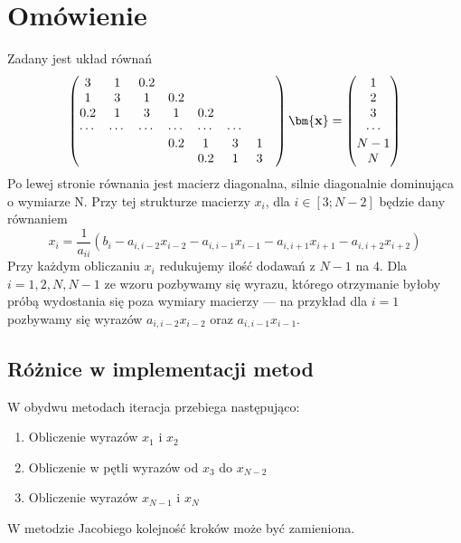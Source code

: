 \documentclass[a4paper,11pt]{article}
\begin{document}
\section{Omówienie}
Zadany jest układ równań
\[
    \left(
        \begin{matrix}
            3 & 1 & 0.2 & & & & & \\
            1 & 3 & 1 & 0.2 & & & & \\
            0.2 & 1 & 3 & 1 & 0.2 & & & \\
            \cdots & \cdots & \cdots & \cdots & \cdots & \cdots & \\
            & & & 0.2 & 1 & 3 & 1 \\
            & & & & 0.2 & 1 & 3
        \end{matrix}
    \right)  
    \bm{\text{\bf{x}}} = 
    \left(
        \begin{matrix}
            1 \\ 2 \\ 3 \\ \cdots \\ N-1 \\ N
        \end{matrix}
    \right)
\]
Po lewej stronie równania jest macierz diagonalna, silnie diagonalnie dominująca o wymiarze N.
Przy tej strukturze macierzy \(x_{i}\), dla \(i \in [3;N-2]\) będzie dany równaniem
\[
    x_{i} = \frac{1}{a_{ii}}(b_{i} - a_{i,i-2}x_{i-2} - a_{i,i-1}x_{i-1} 
    - a_{i,i+1}x_{i+1}-a_{i,i+2}x_{i+2})
\]
Przy każdym obliczaniu \(x_{i}\) redukujemy ilość dodawań z \(N-1\) na \(4\).
Dla \(i = 1, 2, N, N-1\) ze wzoru pozbywamy się wyrazu, 
którego otrzymanie byłoby próbą wydostania się poza wymiary macierzy 
--- na przykład dla \(i = 1\) pozbywamy się wyrazów \(a_{i, i-2}x_{i-2}\) oraz 
\(a_{i, i-1}x_{i-1}\).

\subsection{Różnice w implementacji metod}
W obydwu metodach iteracja przebiega następująco:
\begin{enumerate}
    \item Obliczenie wyrazów \(x_{1}\) i \(x_{2}\)
    \item Obliczenie w pętli wyrazów od \(x_{3}\) do \(x_{N-2}\)
    \item Obliczenie wyrazów \(x_{N-1}\) i \(x_{N}\)
\end{enumerate}

W metodzie Jacobiego kolejność kroków może być zamieniona.
\end{document}
